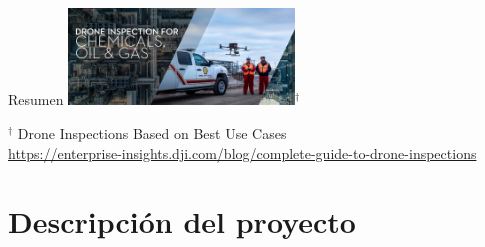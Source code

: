 \documentclass[
	12pt, %
	aspectratio=169, %
]{beamer}
\begin{document}
\begin{frame}{Resumen}
  \hfil
  \includegraphics[width=0.45\textwidth,height=0.35\textheight]{DJI_B4}$^\dag$\\
  \rule{0in}{1.2em}$^\dag$ \small Drone Inspections Based on Best Use Cases \\
  \tiny \url{https://enterprise-insights.dji.com/blog/complete-guide-to-drone-inspections}
\end{frame}

\section{Descripción del proyecto}
\end{document}
